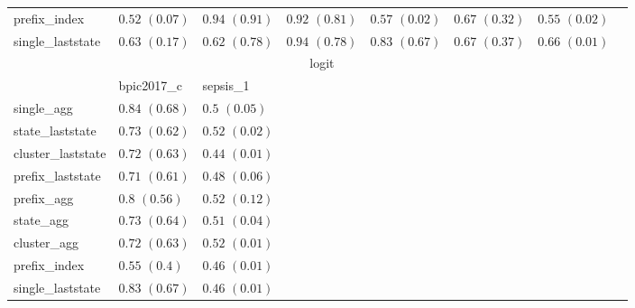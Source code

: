 \documentclass[twoside,11pt]{Latex/Classes/PhDthesisPSnPDF}
\begin{document}
\begin{table}[h]
{\begin{tabular}{llllllll}
			prefix\_index & $0.52$ ${(0.07)}$ & $0.94$ ${(0.91)}$ & $0.92$ ${(0.81)}$ & $0.57$ ${(0.02)}$ & $0.67$ ${(0.32)}$ & $0.55$ ${(0.02)}$ \\
			single\_laststate & $0.63$ ${(0.17)}$ & $0.62$ ${(0.78)}$ & $0.94$ ${(0.78)}$ & $0.83$ ${(0.67)}$ & $0.67$ ${(0.37)}$ & $0.66$ ${(0.01)}$ \\
			\bottomrule
			\toprule
			& \multicolumn{5}{c}{logit}
			\\
			& bpic2017\_c & sepsis\_1
			\\ \midrule
			single\_agg & $\mathbf{0.84}$ $\mathbf{(0.68)}$  & $0.5$ ${(0.05)}$ \\
			state\_laststate & $0.73$ ${(0.62)}$ & $0.52$ ${(0.02)}$ \\
			cluster\_laststate & $0.72$ ${(0.63)}$ & $0.44$ ${(0.01)}$ \\
			prefix\_laststate & $0.71$ ${(0.61)}$ & $0.48$ ${(0.06)}$ \\
			prefix\_agg & $0.8$ ${(0.56)}$ & $0.52$ ${(0.12)}$ \\
			state\_agg & $0.73$ ${(0.64)}$ & $0.51$ ${(0.04)}$ \\
			cluster\_agg & $0.72$ ${(0.63)}$ & $0.52$ ${(0.01)}$ \\
			prefix\_index & $0.55$ ${(0.4)}$ & $0.46$ ${(0.01)}$ \\
			single\_laststate & $0.83$ ${(0.67)}$ & $0.46$ ${(0.01)}$ \\
			\bottomrule

		\end{tabular}%
}
\end{table}
\end{document}
